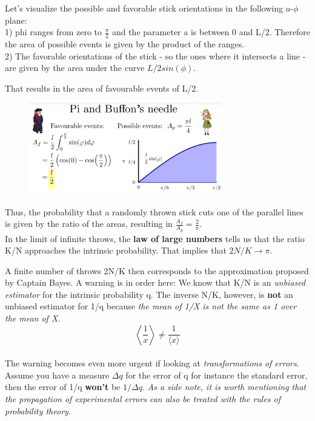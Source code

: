 \documentclass[12pt, a4paper]{scrartcl}
\begin{document}
Let’s visualize the possible and favorable stick orientations in the following
$a$-$\phi$ plane:\\
1) phi ranges from zero to $\frac{\pi}{2}$ and the parameter a is between 0 and
L/2. Therefore the area of possible events is given by the product of
the ranges.\\%
2) The favorable orientations of the stick - so the ones where it intersects a line - are
given by the area under the curve $L/2sin(\phi)$.%

That results in the area of favourable events of L/2.\\%
 \begin{figure}[H]
	\centering
	\includegraphics[width=0.75\textwidth]{9_2.png}
\end{figure}

Thus, the probability that a randomly thrown stick cuts one of the parallel
lines is given by the ratio of the areas, resulting in $\frac{A_f}{A_p}=\frac{2}{\pi}$.\\%

In the limit of inﬁnite throws, the  \textbf{law of large numbers} tells us that the ratio K/N approaches the intrinsic probability.
That implies that $2N/K \rightarrow \pi$.

A finite number of throws 2N/K then corresponds to the approximation proposed by Captain Bayes. A warning is in order here: We know that
K/N is an \textit{unbiased estimator} for the intrinsic probability q. The inverse
N/K, however, is  \textbf{not} an unbiased estimator for 1/q because \textit{the mean of 1/X is not the same as 1 over the mean of X.}
\begin{equation*}\boxed{\left\langle \frac 1x \right\rangle \neq \frac{1}{\langle x\rangle}
}\end{equation*}\\

The warning becomes even more urgent if looking at \textit{transformations
of errors}. Assume you have a measure $\Delta q$ for the error of q for instance the standard
error, then the error of 1/q
\textbf{won’t} be $1/\Delta q$.
\textit{As a side note, it is worth mentioning that the propagation of experimental errors can also be treated with the rules of probability theory.}\\
\end{document}
